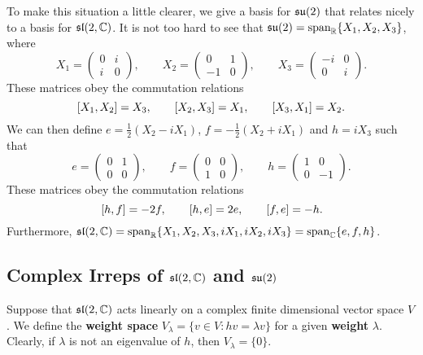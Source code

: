 \documentclass[a4paper]{article}
\begin{document}
To make this situation a little clearer, we give a basis for $\mathfrak{su}(2)$ that relates nicely to a basis for $\mathfrak{sl}(2, \mathbb{C})$. It is not too hard to see that $\mathfrak{su}(2) = \text{span}_{\mathbb{R}}\{X_1, X_2, X_3\}$, where
$$X_1 = \begin{pmatrix}0 & i \\ i & 0\end{pmatrix}, \hspace{2em} X_2 = \begin{pmatrix}0 & 1 \\ -1 & 0\end{pmatrix}, \hspace{2em} X_3 = \begin{pmatrix}-i & 0 \\ 0 & i\end{pmatrix}.$$
These matrices obey the commutation relations
$$ \left[ X_1, X_2 \right] = X_3, \hspace{2em} \left[ X_2, X_3 \right] = X_1, \hspace{2em} \left[ X_3, X_1 \right] = X_2.$$
We can then define ${e} = \frac{1}{2}(X_2 - iX_1)$, ${f} = -\frac{1}{2}(X_2 + iX_1)$ and ${h} = iX_3$ such that
$${e} = \begin{pmatrix}0 & 1 \\ 0 & 0\end{pmatrix}, \hspace{2em} {f} = \begin{pmatrix}0 & 0 \\ 1 & 0\end{pmatrix}, \hspace{2em} {h} = \begin{pmatrix}1 & 0 \\ 0 & -1\end{pmatrix}.$$
These matrices obey the commutation relations
$$\left[ {h}, {f} \right] = -2{f}, \hspace{2em} \left[ {h}, {e} \right] = 2{e}, \hspace{2em} \left[ {f}, {e} \right] = -{h}.$$
Furthermore, $\mathfrak{sl}(2, \mathbb{C}) = \text{span}_{\mathbb{R}}\{X_1, X_2, X_3, iX_1, iX_2, iX_3\} = \text{span}_{\mathbb{C}}\{{e}, {f}, {h}\}$.

\subsection{Complex Irreps of \texorpdfstring{$\mathfrak{sl}(2, \mathbb{C})$}{sl(2, \C)} and \texorpdfstring{$\mathfrak{su}(2)$}{su(2))}}

Suppose that $\mathfrak{sl}(2, \mathbb{C})$ acts linearly on a complex finite dimensional vector space $V$. We define the \textbf{weight space} $V_\lambda = \{v \in V : {h}v = \lambda v\}$ for a given \textbf{weight} $\lambda$. Clearly, if $\lambda$ is not an eigenvalue of ${h}$, then $V_\lambda = \{0\}$.
\end{document}
